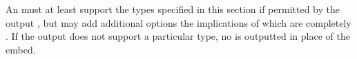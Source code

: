 An  must at least support the types specified in this section if permitted by the output , but may add additional options the implications of which are completely . If the output  does not support a particular type, no  is outputted in place of the  embed. \\





